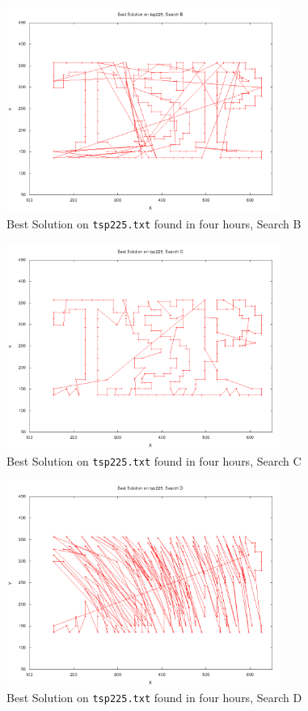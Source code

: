\documentclass{article}
\begin{document}
\begin{figure}[p]
	\centering
	\includegraphics[width=0.8\textwidth]{../images/paths_search_b.png}
	\caption{Best Solution on {\tt tsp225.txt} found in four hours, Search B}
	\label{fig:paths_search_b}
\end{figure}

\begin{figure}[p]
	\centering
	\includegraphics[width=0.8\textwidth]{../images/paths_search_c.png}
	\caption{Best Solution on {\tt tsp225.txt} found in four hours, Search C}
	\label{fig:paths_search_c}
\end{figure}

\begin{figure}[p]
	\centering
	\includegraphics[width=0.8\textwidth]{../images/paths_search_d.png}
	\caption{Best Solution on {\tt tsp225.txt} found in four hours, Search D}
	\label{fig:paths_search_d}
\end{figure}
\end{document}

